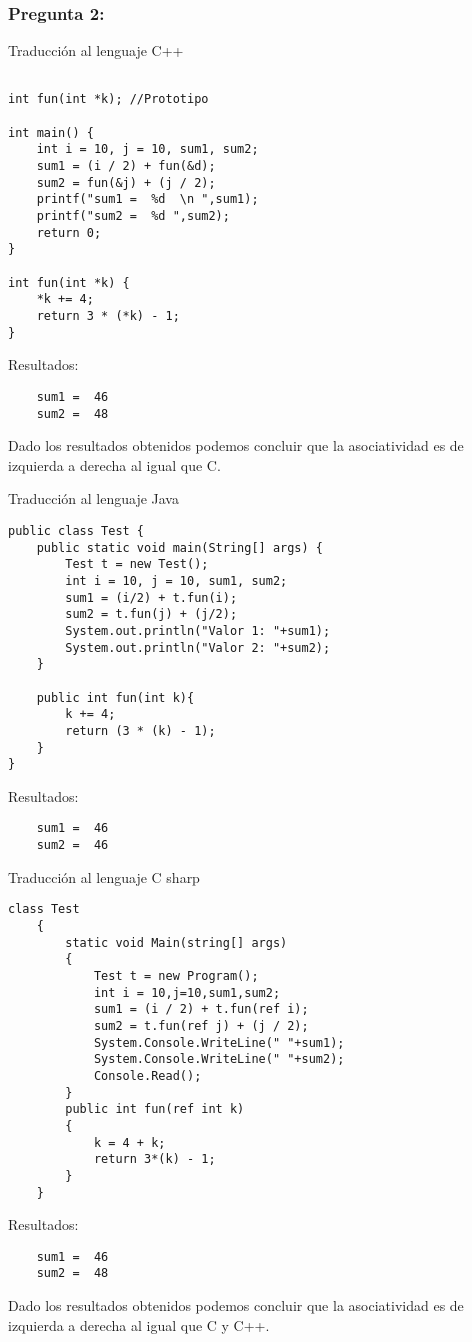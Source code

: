 \documentclass[11pt]{article}
\begin{document}
\subsubsection{Pregunta 2:}
Traducción al lenguaje C++

\begin{lstlisting}[frame = single]

int fun(int *k); //Prototipo

int main() {
    int i = 10, j = 10, sum1, sum2;
    sum1 = (i / 2) + fun(&d);
    sum2 = fun(&j) + (j / 2);
    printf("sum1 =  %d  \n ",sum1);
    printf("sum2 =  %d ",sum2);
    return 0;
}

int fun(int *k) {
    *k += 4;
    return 3 * (*k) - 1;
}
\end{lstlisting}

\noindent Resultados:
\begin{verbatim}
	sum1 =  46
	sum2 =  48
\end{verbatim}

Dado los resultados obtenidos podemos concluir que la asociatividad es de izquierda a derecha al igual que C.

Traducción al lenguaje Java

\begin{lstlisting}[frame = single]
public class Test {
    public static void main(String[] args) {
        Test t = new Test();
        int i = 10, j = 10, sum1, sum2;
        sum1 = (i/2) + t.fun(i);
        sum2 = t.fun(j) + (j/2);
        System.out.println("Valor 1: "+sum1);
        System.out.println("Valor 2: "+sum2);
    }

    public int fun(int k){
        k += 4;
        return (3 * (k) - 1);
    }
}
\end{lstlisting}
\noindent Resultados:
\begin{verbatim}
	sum1 =  46
	sum2 =  46
\end{verbatim}

Traducción al lenguaje C sharp

\begin{lstlisting}[frame = single]
class Test
    {
        static void Main(string[] args)
        {
            Test t = new Program();
            int i = 10,j=10,sum1,sum2;
            sum1 = (i / 2) + t.fun(ref i);
            sum2 = t.fun(ref j) + (j / 2);
            System.Console.WriteLine(" "+sum1);
            System.Console.WriteLine(" "+sum2);
            Console.Read();
        }
        public int fun(ref int k)
        {
            k = 4 + k;
            return 3*(k) - 1;
        }
    }
\end{lstlisting}
\noindent Resultados:
\begin{verbatim}
	sum1 =  46
	sum2 =  48
\end{verbatim}
Dado los resultados obtenidos podemos concluir que la asociatividad es de izquierda a derecha al igual que C y C++.
\end{document}
